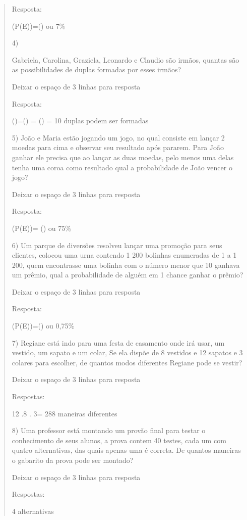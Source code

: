 \begin{quote}
\begin{escolha}
Resposta:

(P(E))=() ou 7\%

4)

Gabriela, Carolina, Graziela, Leonardo e Claudio são irmãos, quantas são
as possibilidades de duplas formadas por esses irmãos?

Deixar o espaço de 3 linhas para resposta

Resposta:

()=() = () = 10
duplas podem ser formadas

5) João e Maria estão jogando um jogo, no qual consiste em lançar 2
moedas para cima e observar seu resultado após pararem. Para João ganhar
ele precisa que ao lançar as duas moedas, pelo menos uma delas tenha uma
coroa como resultado qual a probabilidade de João vencer o jogo?

Deixar o espaço de 3 linhas para resposta

Resposta:

(P(E))= () ou 75\%

6) Um parque de diversões resolveu lançar uma promoção para seus
clientes, colocou uma urna contendo 1 200 bolinhas enumeradas de 1 a 1
200, quem encontrasse uma bolinha com o número menor que 10 ganhava um
prêmio, qual a probabilidade de alguém em 1 chance ganhar o prêmio?

Deixar o espaço de 3 linhas para resposta

Resposta:

(P(E))=() ou 0,75\%

7) Regiane está indo para uma festa de casamento onde irá usar, um
vestido, um sapato e um colar, Se ela dispõe de 8 vestidos e 12 sapatos
e 3 colares para escolher, de quantos modos diferentes Regiane pode se
vestir?

Deixar o espaço de 3 linhas para resposta

Respostas:

12 .8 . 3= 288 maneiras diferentes

8) Uma professor está montando um provão final para testar o
conhecimento de seus alunos, a prova contem 40 testes, cada um com
quatro alternativas, das quais apenas uma é correta. De quantos maneiras
o gabarito da prova pode ser montado?

Deixar o espaço de 3 linhas para resposta

Respostas:

4 alternativas


\end{escolha}
\end{quote}
